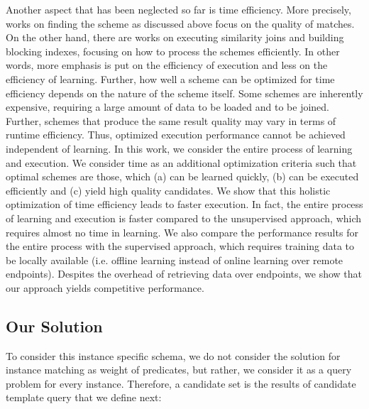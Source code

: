 Another aspect that has been neglected so far is time efficiency. More precisely, works on finding the scheme as discussed above focus on the quality of matches. On the other hand, there are works on executing similarity joins and building blocking indexes, focusing on how to process the schemes efficiently. In other words, more emphasis is put on the efficiency of execution and less on the efficiency of learning.   Further, how well a scheme can be optimized for time efficiency depends on the nature of the scheme itself. Some schemes are inherently expensive, requiring a large amount of data to be loaded and to be joined. Further, schemes that produce the same result quality may vary in terms of runtime efficiency. Thus, optimized execution performance cannot be achieved independent of learning. In this work, we consider the entire process of learning and execution. We consider time as an additional optimization criteria such that optimal schemes are those, which (a) can be learned quickly, (b) can be executed efficiently and (c) yield high quality candidates. We show that this holistic optimization of time efficiency leads to faster execution. In fact, the entire process of learning and execution is faster compared to the unsupervised approach, which requires almost no time in learning. We also compare the performance results for the entire process with the supervised approach, which requires training data to be locally available (i.e. offline learning instead of online learning over remote endpoints). Despites the overhead of retrieving data over endpoints, we show that our approach yields competitive performance. 


\subsection{Our Solution}
To consider this instance specific schema, we do not consider the solution for instance matching as weight of predicates, but rather, we consider it as a query problem for every instance. Therefore, a candidate set is the results of candidate template query that we define next:



